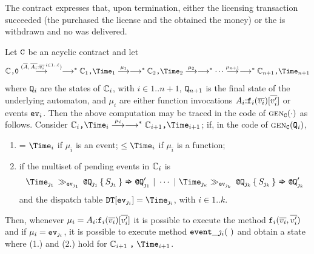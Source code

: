 The contract expresses that, upon termination, either the licensing
transaction succeeded (the  purchased the license
and the  obtained the money) or the
 is withdrawn and no  was delivered.

\begin{theorem}[Soundness]
  \label{thm.soundnessacyclic}
  Let $\tt C$ be an acyclic {\Stipula} contract
  and let
  \[
    \contract {\comma} {\tt 0} \lred{(\vect A,\, \vect{A_i}{:} \vect{v_i}{\,}^{i \in 1..\ell})}
    \lred{}^* \contract_1 {\comma} \Time_1 \lred{\mu_1} \lred{}^* 
    \contract_2 {\comma} \Time_2 \lred{\mu_2} \lred{}^* \cdots 
    \lred{\mu_{n+1}} \lred{}^* \contract_{n+1} {\comma} \Time_{n+1}
  \]
  where ${\tt Q}_i$ are the states of $\mathbb{C}_i$, with $i \in 1..n+1$,
  ${\tt Q}_{n+1}$ is the final state of the underlying automaton, and
  $\mu_i$ are either function invocations
  $A_i{:}\texttt{f}_i(\overline{v_i})[\overline{v_i'}]$ or events ${\tt ev}_i$. Then the
  above computation may be traced in the code of
  $\mbox{\sc gen}_{\tt C}(\cdot)$ as follows. Consider
  $\contract_i {\comma} \Time_i \lred{\mu_i} \lred{}^* \contract_{i+1}
  {\comma} \Time_{i+1}$; if, in the code of $\mbox{\sc gen}_{\tt C}({\tt Q}_i)$,
  \begin{enumerate}
  \item {} = $\Time_i$ if $\mu_i$ is an event;
     $\leq \Time_i$ if $\mu_i$ is a function;
  \item if the multiset of pending events in $\mathbb{C}_i$ is
    \[
      {\Time}_{\jmath_1} \,\event_{\ev_{\jmath_1}}\,
      \Qwithat_{\jmath_1}\, \{ \, S_{\jmath_1} \,\} \,\tostate\,
      \Qwithat_{\jmath_1}' ~|~ \cdots ~|~ {\Time}_{\jmath_\kappa}
      \event_{\ev_{\jmath_k}}\, \Qwithat_{\jmath_k}\, \{ \,
      S_{\jmath_k} \,\} \,\tostate\, \Qwithat_{\jmath_k}'
    \]
    and the dispatch table
    ${\tt DT}[\ev_{\jmath_i}] = {\Time}_{\jmath_i}$, with
    $i \in 1.. k$.
\end{enumerate}
Then, whenever $\mu_i = A_i{:}\texttt{f}_i(\overline{v_i})[\overline{v_i'}]$ it is
possible to execute the method $\texttt{f}_i(\overline{v_i},\overline{v_i'})$ and if
$\mu_i = {\tt ev}_{\jmath_i}$, it is possible to execute method
${\tt event}\_{\jmath_i}(~)$ and obtain a state where (1.) and (2.)
hold for $\contract_{i+1} \comma \Time_{i+1}$.
\end{theorem}

